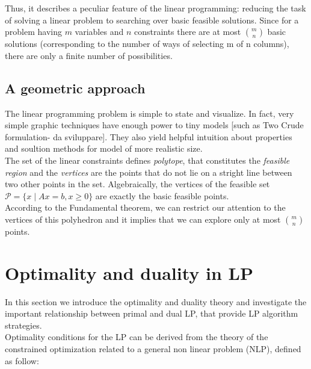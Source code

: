 \documentclass[a4paper,10 pt,titlepage,twoside]{book}
\theoremstyle{plain}
\theoremstyle{definition}
\newtheorem{ex}[thm]{Example}
\theoremstyle{remark}
\begin{document}
Thus, it describes a peculiar feature of the linear programming: reducing the task of solving a linear problem to searching over basic feasible solutions. Since for a problem having $m$ variables and $n$ constraints there are at most ${m}\choose{n}$ basic solutions (corresponding to the number of ways of selecting m of n columns), there are only a finite number of possibilities. 

\subsection*{A geometric approach}
The linear programming problem is simple to state and visualize. In fact, very simple graphic techniques have enough power to tiny models [such as Two Crude formulation- da sviluppare]. They also yield helpful intuition about properties and soultion methods for model of more realistic size.\\ The set of the linear constraints defines  \textit{polytope}, that constitutes the \textit{feasible region} and the \textit{vertices} are the points that do not lie on a stright line between two other points in the set. Algebraically, the vertices of the feasible set $\mathcal{P}=\lbrace x\; |\; Ax = b , x \geq0\rbrace$ are exactly the basic feasible points.\\ According to the Fundamental theorem, we can restrict our attention to the vertices of this polyhedron and it implies that we can explore only at most  ${m}\choose{n}$ points. 

\section{Optimality and duality in LP}
In this section we introduce the optimality and duality theory and investigate the important relationship between primal and dual LP, that provide LP algorithm strategies.\\ 
Optimality conditions for the LP can be derived from the theory of the constrained optimization related to a general non linear problem (NLP), defined as follow:
\end{document}
